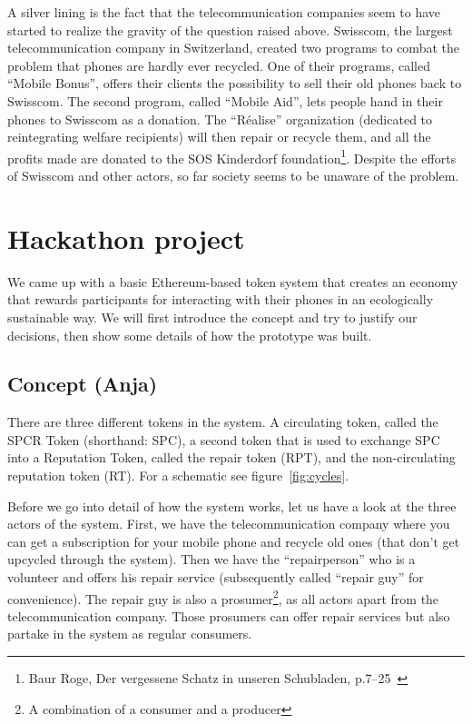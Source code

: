 \documentclass[11pt]{scrartcl}
\begin{document}
A silver lining is the fact that the telecommunication companies seem to have started to realize the gravity of the question raised above. Swisscom, the largest telecommunication company in Switzerland, created two programs to combat the problem that phones are hardly ever recycled. One of their programs, called ``Mobile Bonus'', offers their clients the possibility to sell their old phones back to Swisscom. The second program, called ``Mobile Aid'', lets people hand in their phones to Swisscom as a donation. The ``Réalise'' organization (dedicated to reintegrating welfare recipients) will then repair or recycle them, and all the profits made are donated to the SOS Kinderdorf foundation\footnote{Baur Roge, Der vergessene Schatz in unseren Schubladen, p.7--25~\cite{Swisscom}}. Despite the efforts of Swisscom and other actors, so far society seems to be unaware of the problem.

\section{Hackathon project}

We came up with a basic Ethereum-based token system that creates an economy that
rewards participants for interacting with their phones in an ecologically sustainable
way. We will first introduce the concept and try to justify our decisions, then
show some details of how the prototype was built.

\subsection{Concept (Anja)}
There are three different tokens in the system. A circulating token, called the SPCR Token (shorthand: SPC), a  second token that is used to exchange SPC into a Reputation Token, called the repair token (RPT), and the non-circulating reputation token (RT). For a schematic see figure~\ref{fig:cycles}.

Before we go into detail of how the system works, let us have a look at the three actors of the system. First, we have the telecommunication company where you can get a subscription for your mobile phone and recycle old ones (that don't get upcycled through the system). Then we have the ``repairperson'' who is a volunteer and offers his repair service (subsequently called ``repair guy'' for convenience). The repair guy is also a prosumer\footnote{A combination of a consumer and a producer}, as all actors apart from the telecommunication company. Those prosumers can offer repair services but also partake in the system as regular consumers.
\end{document}
